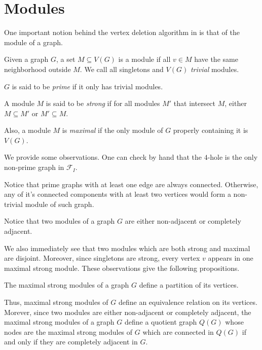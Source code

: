 \documentclass{article}
\begin{document}
    \section{Modules}

    One important notion behind
    the vertex deletion algorithm in
    \cite{main} is that of
    the module of a graph. 

    \begin{defn}
        Given a graph $G$, a set $M \subseteq V\left(G\right)$
        is a module if all $v \in M$ have
        the same neighborhood outside $M$.
        We call all singletons and $V\left(G\right)$
        \emph{trivial} modules.
        
        $G$ is said to be
        \emph{prime} if
        it only has trivial modules.

        A module $M$ is said to 
        be \emph{strong} if for all modules
        $M'$ that intersect $M$,
        either $M \subseteq M'$ or
        $M' \subseteq M$.

        Also, a module $M$ is \emph{maximal} if 
        the only module of $G$ properly
        containing it is $V\left(G\right)$.
    \end{defn}
    
    We provide some observations.
    One can check by hand
    that the $4$-hole is the
    only non-prime
    graph in $\mathcal{F}_{I}$.

    Notice that prime graphs with 
    at least one edge are always
    connected. Otherwise, any
    of it's connected components
    with at least two vertices
    would form a non-trivial module
    of such graph.
    
    Notice that two modules of a graph
    $G$ are either non-adjacent 
    or completely adjacent.

    We also immediately see that two modules
    which are both strong and maximal
    are disjoint. Moreover, since
    singletons are strong, every vertex
    $v$ appears in one maximal strong
    module. These observations give
    the following propositions.

    \begin{prop}
        The maximal strong modules of
        a graph $G$ define a partition
        of its vertices.
    \end{prop}

    Thus, maximal strong modules
    of $G$ define an equivalence
    relation on its vertices.
    Morever, since two modules
    are either non-adjacent
    or completely adjacent, 
    the maximal strong modules
    of a graph $G$ define a
    quotient graph $Q\left(G\right)$ 
    whose nodes are the maximal 
    strong modules of $G$
    which are connected in $Q\left(G\right)$ 
    if and only if they are
    completely adjacent in $G$.
    
\end{document}
